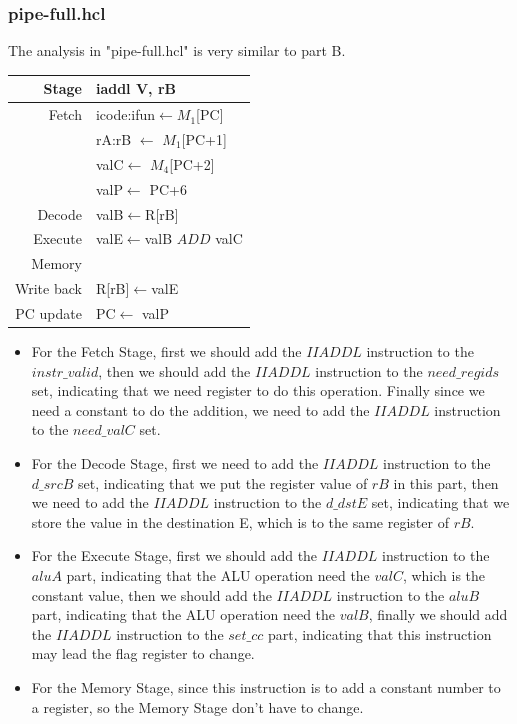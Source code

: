 \documentclass[12pt,a4paper]{article}
\theoremstyle{definition}
\numberwithin{equation}{section}
\numberwithin{figure}{section}
\begin{document}
\subsubsection{pipe-full.hcl}
The analysis in "pipe-full.hcl" is very similar to part B.
\begin{table}[!h]
	\centering
	\begin{tabular}{r|p{3in}} \hline
		\hline
		
		
		
		Stage	& iaddl V, rB \\
		\hline
		\hline
		Fetch&  icode:ifun$\leftarrow$$M_1$[PC]\\
		&  rA:rB $\leftarrow$ $M_1$[PC+1]\\
		&  valC$\leftarrow$ $M_4$[PC+2]\\
		&  valP$\leftarrow$ PC+6\\
		\hline
		Decode&   valB$\leftarrow$R[rB]\\
		\hline
		Execute&  valE$\leftarrow$valB $ADD$ valC  \\
		\hline
		Memory&   \\
		\hline
		Write back& R[rB]$\leftarrow$valE  \\
		\hline
		PC update&   PC$\leftarrow$ valP\\
		\hline
	\end{tabular}
\end{table}
\begin{itemize}
	\item For the Fetch Stage, first we should add the $IIADDL$ instruction to the $instr\_valid$, then we should add the $IIADDL$ instruction to the $need\_regids$ set, indicating that we need register to do this operation. Finally since we need a constant to do the addition, we need to add the $IIADDL$ instruction to the $need\_valC$ set.
	\item For the Decode Stage, first we need to add the $IIADDL$ instruction to the $d\_srcB$ set, indicating that we put the register value of $rB$ in this part, then we need to add the $IIADDL$ instruction to the $d\_dstE$ set, indicating that we store the value in the destination E, which is to the same register of $rB$.
	\item For the Execute Stage, first we should add the $IIADDL$ instruction to the $aluA$ part, indicating that the ALU operation need the $valC$, which is the constant value, then we should add the $IIADDL$ instruction to the $aluB$ part, indicating that the ALU operation need the $valB$, finally we should add the $IIADDL$ instruction to the $set\_cc$ part, indicating that this instruction may lead the flag register to change.
	\item For the Memory Stage, since this instruction is to add a constant number to a register, so the Memory Stage don't have to change.
\end{itemize}
\end{document}
